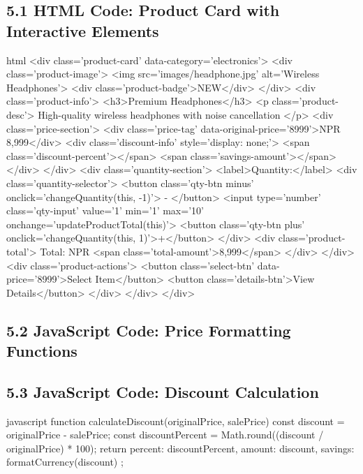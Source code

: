\documentclass[a4paper,12pt]{article}
\begin{document}
\subsection*{5.1 HTML Code: Product Card with Interactive Elements}
\begin{code}[fontsize=\small]{html}
<div class='product-card' data-category='electronics'>
    <div class='product-image'>
        <img src='images/headphone.jpg' alt='Wireless Headphones'>
        <div class='product-badge'>NEW</div>
    </div>
    <div class='product-info'>
        <h3>Premium Headphones</h3>
        <p class='product-desc'>
            High-quality wireless headphones with noise cancellation
        </p>
        <div class='price-section'>
            <div class='price-tag' data-original-price='8999'>NPR 8,999</div>
            <div class='discount-info' style='display: none;'>
                <span class='discount-percent'></span>
                <span class='savings-amount'></span>
            </div>
        </div>
        <div class='quantity-section'>
            <label>Quantity:</label>
            <div class='quantity-selector'>
                <button class='qty-btn minus' onclick='changeQuantity(this, -1)'> - </button>
                <input type='number' class='qty-input' value='1' min='1' max='10' onchange='updateProductTotal(this)'>
                <button class='qty-btn plus' onclick='changeQuantity(this, 1)'>+</button>
            </div>
            <div class='product-total'>
                Total: NPR <span class='total-amount'>8,999</span>
            </div>
        </div>
        <div class='product-actions'>
            <button class='select-btn' data-price='8999'>Select Item</button>
            <button class='details-btn'>View Details</button>
        </div>
    </div>
</div>
\end{code}

\subsection*{5.2 JavaScript Code: Price Formatting Functions}

\subsection*{5.3 JavaScript Code: Discount Calculation}
\begin{code}[fontsize=\small]{javascript}
function calculateDiscount(originalPrice, salePrice) {
    const discount = originalPrice - salePrice;
    const discountPercent = Math.round((discount / originalPrice) * 100);
    return {
        percent: discountPercent,
        amount: discount,
        savings: formatCurrency(discount)
    };
}
\end{code}
\end{document}
